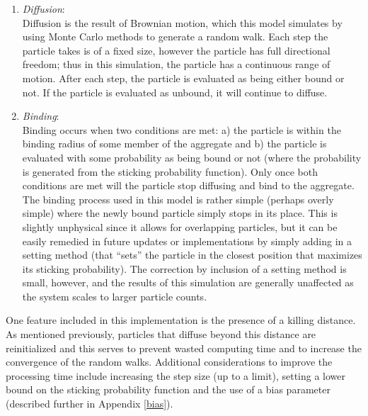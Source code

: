 \documentclass{article}
\begin{document}
\begin{enumerate}
	
	\item{ \textit{Diffusion}:\\
		Diffusion is the result of Brownian motion, which this model simulates by using Monte Carlo methods to generate a random walk. 		Each step the particle takes is of a fixed size, however the particle has full directional freedom; thus in this simulation, the particle has a continuous range of motion. After each step, the particle is evaluated as being either bound or not. If the particle is evaluated as unbound, it will continue to diffuse.
	\label{step1}}
	
	\item{	\textit{Binding}:\\
		Binding occurs when two conditions are met: a) the particle is within the binding radius of some member of the aggregate and b) the particle is evaluated with some probability as being bound or not (where the probability is generated from the sticking probability function). Only once both conditions are met will the particle stop diffusing and bind to the aggregate. The binding process used in this model is rather simple (perhaps overly simple) where the newly bound particle simply stops in its place. This is slightly unphysical since it allows for overlapping particles, but it can be easily remedied in future updates or implementations by simply adding in a setting method (that ``sets'' the particle in the closest position that maximizes its sticking probability). The correction by inclusion of a setting method is small, however, and the results of this simulation are generally unaffected as the system scales to larger particle counts.
	\label{step2}}
	
\end{enumerate}

\noindent One feature included in this implementation is the presence of a killing distance. As mentioned previously, particles that diffuse beyond this distance are reinitialized and this serves to prevent wasted computing time and to increase the convergence of the random walks. Additional considerations to improve the processing time include increasing the step size (up to a limit), setting a lower bound on the sticking probability function and the use of a bias parameter (described further in Appendix \ref{bias}).

\end{document}
